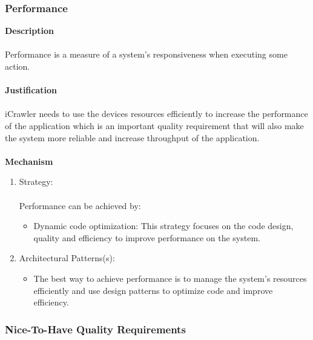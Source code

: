 			\subsubsection*{Performance}
			\textbf{Description}\\\\
			Performance is a measure of a system's responsiveness when executing some action.\\\\
			\textbf{Justification}\\\\
			iCrawler needs to use the devices resources efficiently to increase the performance of the application which is an important quality requirement that will also make the system more reliable and increase throughput of the application.\\\\
			\textbf{Mechanism}
			\begin{enumerate}
				\item Strategy:\\\\
				Performance can be achieved by:
				\begin{itemize}
				\item Dynamic code optimization: This strategy focuses on the code design, quality and efficiency to improve performance on the system.  
				\end{itemize}
				\item Architectural Patterns(s):
				\begin{itemize}
				\item The best way to achieve performance is to manage the system's resources efficiently and use design patterns to optimize code and improve efficiency.   
				\end{itemize}
			\end{enumerate}	
			
		\newpage
		\subsubsection{Nice-To-Have Quality Requirements}
